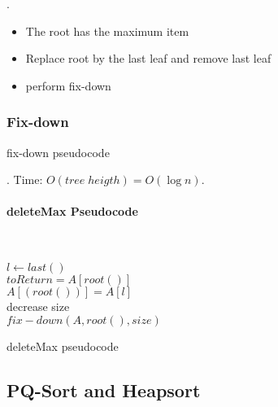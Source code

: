 \documentclass{article}
\begin{document}
\begin{algo}[].
    \begin{itemize}
        \item The root has the maximum item 
        \item Replace root by the last leaf and remove last leaf
        \item perform fix-down
    \end{itemize}
\end{algo}

\subsubsection{Fix-down}

\begin{algorithm}[H] 
    \caption{fix-down pseudocode}
\end{algorithm}

\begin{discovery}[].
    Time: $O(tree \; heigth) = O(\log{n})$. 
\end{discovery}

\paragraph{deleteMax Pseudocode} \phantom{text}\\
\begin{algorithm}[H] 
    $l \leftarrow last()$ \\ 
    $toReturn = A[root()]$ \\ 
    $A[(root())] = A[l]$ \\ 
    decrease size \\ 
    $fix-down (A, root(), size)$
    \caption{deleteMax pseudocode}
\end{algorithm}

\subsection{PQ-Sort and Heapsort}
\end{document}
